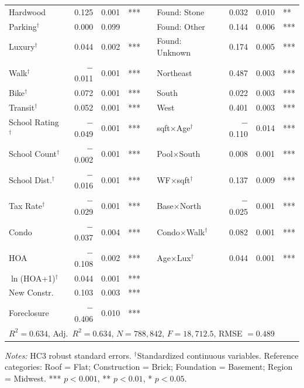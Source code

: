 \begin{landscape}
\begin{table}[H]
\begin{threeparttable}
\begin{tabular}{lrrlclrrl}
Hardwood & 0.125 & 0.001 & *** & & Found: Stone & 0.032 & 0.010 & ** \\
Parking$^\dagger$ & 0.000 & 0.099 & & & Found: Other & 0.144 & 0.006 & *** \\
Luxury$^\dagger$ & 0.044 & 0.002 & *** & & Found: Unknown & 0.174 & 0.005 & *** \\
Walk$^\dagger$ & $-$0.011 & 0.001 & *** & & Northeast & 0.487 & 0.003 & *** \\
Bike$^\dagger$ & 0.072 & 0.001 & *** & & South & 0.022 & 0.003 & *** \\
Transit$^\dagger$ & 0.052 & 0.001 & *** & & West & 0.401 & 0.003 & *** \\
School Rating$^\dagger$ & $-$0.049 & 0.001 & *** & & sqft$\times$Age$^\dagger$ & $-$0.110 & 0.014 & *** \\
School Count$^\dagger$ & $-$0.002 & 0.001 & *** & & Pool$\times$South & 0.008 & 0.001 & *** \\
School Dist.$^\dagger$ & $-$0.016 & 0.001 & *** & & WF$\times$sqft$^\dagger$ & 0.137 & 0.009 & *** \\
Tax Rate$^\dagger$ & $-$0.029 & 0.001 & *** & & Base$\times$North & $-$0.025 & 0.001 & *** \\
Condo & $-$0.037 & 0.004 & *** & & Condo$\times$Walk$^\dagger$ & 0.082 & 0.001 & *** \\
HOA & $-$0.108 & 0.002 & *** & & Age$\times$Lux$^\dagger$ & 0.044 & 0.001 & *** \\
$\ln$(HOA+1)$^\dagger$ & 0.044 & 0.001 & *** & & & & & \\
New Constr. & 0.103 & 0.003 & *** & & & & & \\
Foreclosure & $-$0.406 & 0.010 & *** & & & & & \\
\midrule
\multicolumn{9}{l}{$R^2 = 0.634$, Adj.\ $R^2 = 0.634$, $N = 788{,}842$, $F = 18{,}712.5$, RMSE $= 0.489$} \\
\bottomrule
\end{tabular}
\begin{tablenotes}
\footnotesize
\item \textit{Notes:} HC3 robust standard errors. $^\dagger$Standardized continuous variables. Reference categories: Roof = Flat; Construction = Brick; Foundation = Basement; Region = Midwest. *** $p<0.001$, ** $p<0.01$, * $p<0.05$.
\end{tablenotes}
\end{threeparttable}
\end{table}
\end{landscape}


